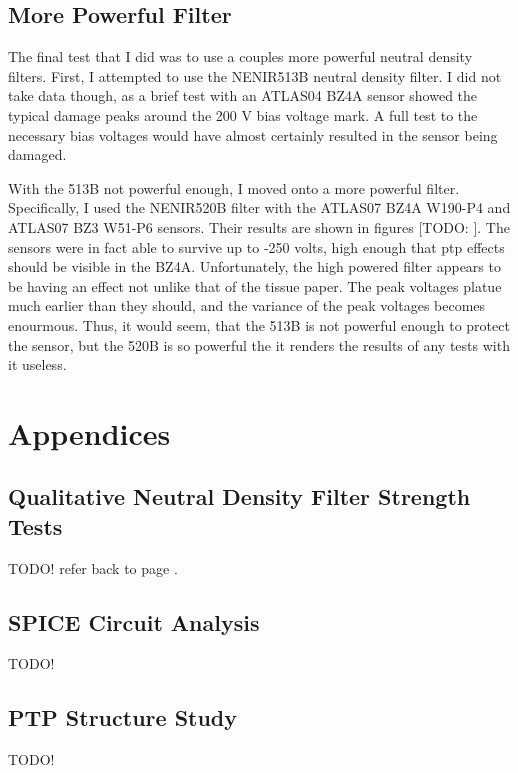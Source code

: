 \documentclass{report}
\begin{document}
        \section{More Powerful Filter} \label{sect:new_filters}
            The final test that I did was to use a couples more powerful neutral density filters. First, I attempted to use the NENIR513B neutral density filter. I did not take data though, as a brief test with an ATLAS04 BZ4A sensor showed the typical damage peaks around the 200 V bias voltage mark. A full test to the necessary bias voltages would have almost certainly resulted in the sensor being damaged.  

            With the 513B not powerful enough, I moved onto a more powerful filter. Specifically, I used the NENIR520B filter with the ATLAS07 BZ4A W190-P4 and ATLAS07 BZ3 W51-P6 sensors. Their results are shown in figures [TODO:
            ]. The sensors were in fact able to survive up to -250 volts, high enough that ptp effects should be visible in the BZ4A. Unfortunately, the high powered filter appears to be having an effect not unlike that of the tissue paper. The peak voltages platue much earlier than they should, and the variance of the peak voltages becomes enourmous. Thus, it would seem, that the 513B is not powerful enough to protect the sensor, but the 520B is so powerful the it renders the results of any tests with it useless.



    \chapter{Appendices}
        \section{Qualitative Neutral Density Filter Strength Tests} \label{sect:filter_tests}
            TODO! refer back to page \pageref{page:504_to_black_filter}.

        \section{SPICE Circuit Analysis}
            TODO!

        \section{PTP Structure Study} \label{sect:ptp_study}
            TODO!
\end{document}
